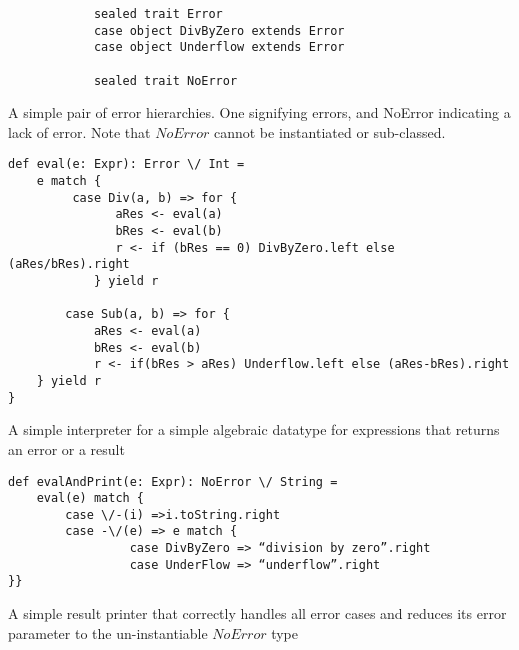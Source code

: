 \documentclass[12pt,a4paper,twoside,openright]{report}
\begin{document}
{{\begin{framed}
	\begin{framed}
		\begin{verbatim}
			sealed trait Error
			case object DivByZero extends Error
			case object Underflow extends Error

			sealed trait NoError
		\end{verbatim}
	\end{framed}
	
	A simple pair of error hierarchies. One signifying errors, and NoError indicating a lack of error. Note that $NoError$ cannot be instantiated or sub-classed.


	\begin{framed}
		\begin{verbatim}
def eval(e: Expr): Error \/ Int = 
    e match {
         case Div(a, b) => for {
               aRes <- eval(a)
               bRes <- eval(b)
               r <- if (bRes == 0) DivByZero.left else (aRes/bRes).right
            } yield r

        case Sub(a, b) => for {
            aRes <- eval(a)
            bRes <- eval(b)
            r <- if(bRes > aRes) Underflow.left else (aRes-bRes).right
    } yield r
}
		\end{verbatim}
	\end{framed}
	
	A simple interpreter for a simple algebraic datatype for expressions that returns an error or a result
	
	\begin{framed}
		\begin{verbatim}
def evalAndPrint(e: Expr): NoError \/ String = 
    eval(e) match {
        case \/-(i) =>i.toString.right
        case -\/(e) => e match {
                 case DivByZero => “division by zero”.right
                 case UnderFlow => “underflow”.right
}}
		\end{verbatim}
	\end{framed}
	A simple result printer that correctly handles all error cases and reduces its error parameter to the un-instantiable $NoError$ type
		
\end{framed}


}}
\end{document}
